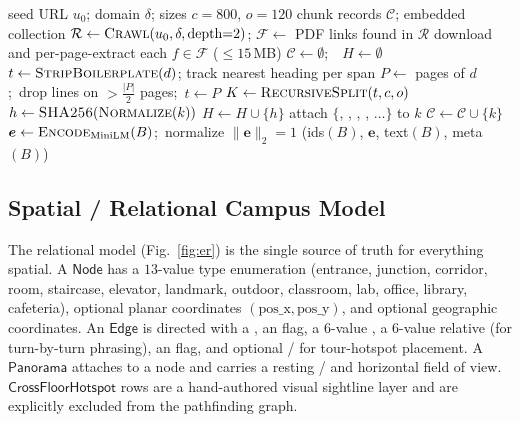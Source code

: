 \begin{algorithm}[!t]
\caption{Institutional Knowledge Acquisition and Chunking}
\label{alg:kb}
\begin{algorithmic}[1]
\Require seed URL $u_0$; domain $\delta$; sizes $c=800$, $o=120$
\Ensure chunk records $\mathcal{C}$; embedded collection 
\State $\mathcal{R}\gets \textsc{Crawl}(u_0,\delta,\text{depth}{=}2)$;
       $\mathcal{F}\gets$ PDF links found in $\mathcal{R}$
\State download and per-page-extract each $f\in\mathcal{F}$ ($\le 15$\,MB)
\State $\mathcal{C}\gets\emptyset$;\ \ $H\gets\emptyset$ 
     \State $t\gets\textsc{StripBoilerplate}(d)$; track nearest heading per span
  \Else
     \State $P\gets$ pages of $d$;\ drop lines on $>\!\tfrac{|P|}{2}$ pages;\ $t\gets P$
  \EndIf
  \State $K\gets \textsc{RecursiveSplit}(t, c, o)$
     \State $h\gets \textsc{SHA256}(\textsc{Normalize}(k))$
        \State $H\gets H\cup\{h\}$
        \State attach $\{$, , ,
               , $\dots\}$ to $k$
        \State $\mathcal{C}\gets\mathcal{C}\cup\{k\}$
     \EndIf
  \EndFor
\EndFor
{}
  \State $\bm{e}\gets \textsc{Encode}_{\text{MiniLM}}(B)$;\ normalize $\|\bm{e}\|_2{=}1$
  \State {}(ids$(B)$, $\bm{e}$, text$(B)$, meta$(B)$)
\EndFor
\end{algorithmic}
\end{algorithm}

\subsection{Spatial / Relational Campus Model}
The relational model (Fig.~\ref{fig:er}) is the single source of truth for
everything spatial. A $\textsf{Node}$ has a $13$-value type enumeration
(entrance, junction, corridor, room, staircase, elevator, landmark,
outdoor, classroom, lab, office, library, cafeteria), optional planar
coordinates $(\text{pos\_x}, \text{pos\_y})$, and optional geographic
coordinates. An $\textsf{Edge}$ is directed with a , an
 flag, a $6$-value , a $6$-value
relative  (for turn-by-turn phrasing), an 
flag, and optional / for tour-hotspot
placement. A $\textsf{Panorama}$ attaches to a node and carries a resting
/ and horizontal field of view.
$\textsf{CrossFloorHotspot}$ rows are a hand-authored visual sightline
layer and are explicitly excluded from the pathfinding graph.

